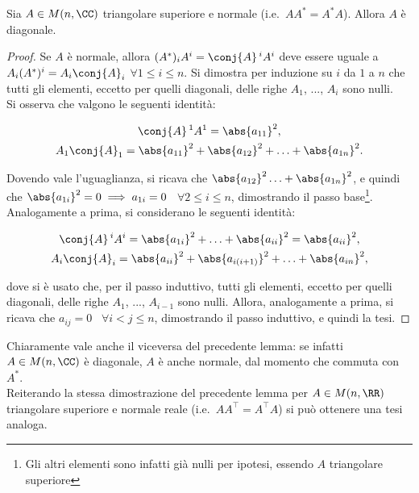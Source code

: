\setcounter{lemma}{0}

\begin{lemma}
	Sia $A \in M(n, \CC)$ triangolare superiore e normale (i.e.~$A A^* = A^* A$). Allora
	$A$ è diagonale.
\end{lemma}

\begin{proof}
	Se $A$ è normale, allora $(A^*)_i A^i = \conj{A}\,^i A^i$ deve essere uguale a
	$A_i (A^*)^i = A_i \conj{A}_i$ $\forall 1 \leq i \leq n$. Si dimostra per induzione
	su $i$ da $1$ a $n$ che tutti gli elementi, eccetto per quelli diagonali, delle
	righe $A_1$, ..., $A_i$ sono nulli. \\
	
	\basestep Si osserva che valgono le seguenti identità:
	
	\begin{gather*}
		\conj{A}\,^1 A^1 = \abs{a_{11}}^2, \\
		A_1 \conj{A}_1 = \abs{a_{11}}^2 + \abs{a_{12}}^2 + \ldots + \abs{a_{1n}}^2.
	\end{gather*}
	
	Dovendo vale l'uguaglianza, si ricava che $\abs{a_{12}}^2 \ldots + \abs{a_{1n}}^2$,
	e quindi che $\abs{a_{1i}}^2 = 0 \implies a_{1i} = 0$ \, $\forall 2 \leq i \leq n$,
	dimostrando il passo base\footnote{Gli altri elementi sono infatti già nulli per ipotesi, essendo
		$A$ triangolare superiore}. \\
	
	\inductivestep Analogamente a prima, si considerano le seguenti identità:
	
	\begin{gather*}
		\conj{A}\,^i A^i = \abs{a_{1i}}^2 + \ldots +  \abs{a_{ii}}^2 = \abs{a_{ii}}^2, \\
		A_i \conj{A}_i = \abs{a_{ii}}^2 + \abs{a_{i(i+1)}}^2 + \ldots + \abs{a_{in}}^2,
	\end{gather*}
	
	dove si è usato che, per il passo induttivo, tutti gli elementi, eccetto per quelli diagonali, delle
	righe $A_1$, ..., $A_{i-1}$ sono nulli. Allora, analogamente a prima, si ricava che
	$a_{ij} = 0$ \, $\forall i < j \leq n$, dimostrando il passo induttivo, e quindi la tesi.
\end{proof}

\begin{remark}\nl
	\li Chiaramente vale anche il viceversa del precedente lemma: se infatti $A \in M(n, \CC)$ è diagonale,
	$A$ è anche normale, dal momento che commuta con $A^*$. \\
	\li Reiterando la stessa dimostrazione del precedente lemma per $A \in M(n, \RR)$ triangolare superiore e normale reale (i.e.~$AA^\top = A^\top A$) si può ottenere una tesi analoga.
\end{remark}

